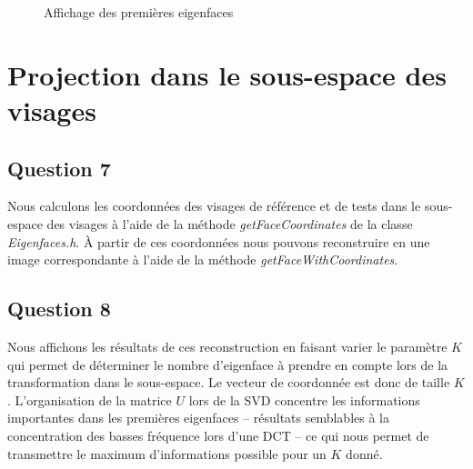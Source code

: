 \documentclass[a4paper]{article}
\begin{document}
\begin{figure}
  \hspace{0.01\textwidth}
  \hspace{0.01\textwidth}
  \hspace{0.01\textwidth}
  \caption{Affichage des premières eigenfaces}
  \label{q6}
\end{figure}

\section{Projection dans le sous-espace des visages}

\subsection{Question 7}

Nous calculons les coordonnées des visages de référence et de tests dans le sous-espace des visages à l'aide
de la méthode {\em getFaceCoordinates} de la classe {\em Eigenfaces.h}.
À partir de ces coordonnées nous pouvons reconstruire en une image correspondante à l'aide de la méthode 
{\em getFaceWithCoordinates}.

\subsection{Question 8}

Nous affichons les résultats de ces reconstruction en faisant varier le paramètre $K$ qui permet de déterminer
le nombre d'eigenface à prendre en compte lors de la transformation dans le sous-espace.
Le vecteur de coordonnée est donc de taille $K$. L'organisation de la matrice $U$ lors de la SVD concentre les
informations importantes dans les premières eigenfaces 
-- résultats semblables à la concentration des basses fréquence lors d'une DCT -- 
ce qui nous permet de transmettre le maximum d'informations possible pour un $K$ donné.
\end{document}
